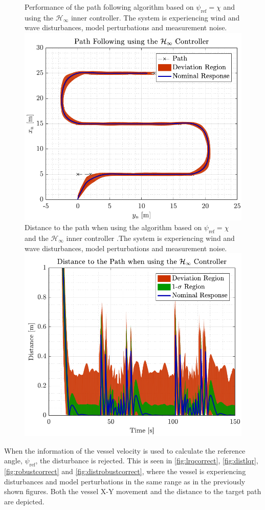 \begin{figure}[H]
	\captionbox 
	{   
		Performance of the path following algorithm based on $\psi_\mathrm{ref}=\chi$ and using the $\mathcal{H}_\infty$ inner controller. The system is experiencing wind and wave disturbances, model perturbations and measurement noise.\label{fig:robwrong}
	}                                                                 
	{                                                                  
		\includegraphics[width=.45\textwidth]{figures/path_rob_no_correc}         
	}                                                                    
	\hspace{5pt}                                                          
	\captionbox  
	{      
		Distance to the path when using the algorithm based on $\psi_\mathrm{ref}=\chi$ and the $\mathcal{H}_\infty$ inner controller .The system is experiencing wind and wave disturbances, model perturbations and measurement noise.\label{fig:distrobwrong}
	}                                                                          
	{
		\includegraphics[width=.45\textwidth]{figures/dist_rob_no_correc}
	}
\end{figure}

When the information of the vessel velocity is used to calculate the reference angle, $\psi_\mathrm{ref}$, the disturbance is rejected. This is seen in \autoref{fig:lrqcorrect}, \ref{fig:distlqr}, \ref{fig:robustcorrect} and \ref{fig:distrobustcorrect}, where the vessel is experiencing disturbances and model perturbations in the same range as in the previously shown figures. Both the vessel X-Y movement and the distance to the target path are depicted. 

